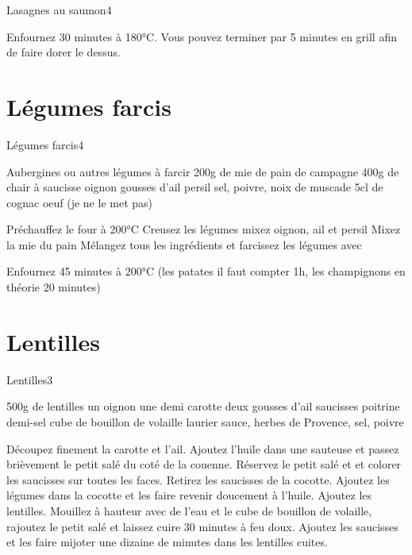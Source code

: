 {\begin{recette}{Lasagnes au saumon}{4}{}{}
\begin{cuisson}
Enfournez 30 minutes à 180°C. Vous pouvez terminer par 5 minutes en grill afin de faire dorer le dessus.
\end{cuisson}
\end{recette}

\section{Légumes farcis}
\begin{recette}{Légumes farcis}{4}{}{}
\begin{ingredients}
\ingredient Aubergines ou autres légumes à farcir
\ingredient[Farce]
\ingredient 200g de mie de pain de campagne
\ingredient 400g de chair à saucisse
 oignon
 gousses d'ail
\ingredient persil
\ingredient sel, poivre, noix de muscade
\ingredient 5cl de cognac
 oeuf (je ne le met pas)
\end{ingredients}

\begin{preparation}
\etape Préchauffez le four à 200°C
\etape Creusez les légumes
\etape mixez oignon, ail et persil
\etape Mixez la mie du pain
\etape Mélangez tous les ingrédients et farcissez les légumes avec
\end{preparation}

\begin{cuisson}
Enfournez 45 minutes à 200°C (les patates il faut compter 1h, les champignons en théorie 20 minutes)
\end{cuisson}
\end{recette}

\section{Lentilles}
\begin{recette}{Lentilles}{3}{}{}
\begin{ingredients}
\ingredient 500g de lentilles
\ingredient un oignon
\ingredient une demi carotte
\ingredient deux gousses d'ail
 saucisses
\ingredient poitrine demi-sel
\ingredient cube de bouillon de volaille
\ingredient laurier sauce, herbes de Provence, sel, poivre
\end{ingredients}

\begin{preparation}
\etape Découpez finement la carotte et l'ail.
\etape Ajoutez l'huile dans une sauteuse et passez brièvement le petit salé du coté de la couenne.
\etape Réservez le petit salé et  et colorer les saucisses sur toutes les faces.
\etape Retirez les saucisses de la cocotte.
\etape Ajoutez les légumes dans la cocotte et les faire revenir doucement à l'huile.
\etape Ajoutez les lentilles. Mouillez à hauteur avec de l'eau et le cube de bouillon de volaille, rajoutez le petit salé et 
laissez cuire 30 minutes à feu doux.
\etape Ajoutez les saucisses et les faire mijoter une dizaine de minutes dans les lentilles cuites.
\end{preparation}
\end{recette}

}
